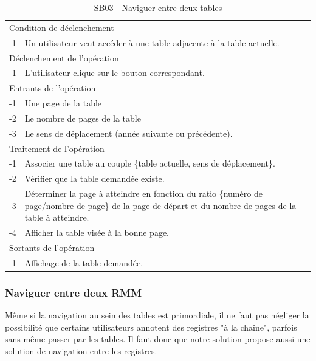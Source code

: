 \documentclass[a4paper]{article}
\begin{document}
\begin{table}[H]
  \centering
   \small
	\begin{tabular}{|c|p{12cm}|}
   		\hline
   			\rowcolor{lightgray}\multicolumn{2}{|c|}{\textbf{SB03 - Naviguer entre deux tables}} \\
   		\hline
   			\multicolumn{2}{|l|}{Condition de d\'eclenchement} \\
   		\hline
   		-1 & Un utilisateur veut acc\'eder \`a une table adjacente à la table actuelle. \\
   		\hline
   			\multicolumn{2}{|l|}{D\'eclenchement de l'op\'eration} \\
   		\hline
   			-1 & L'utilisateur clique sur le bouton correspondant. \\
   		\hline
   			\multicolumn{2}{|l|}{Entrants de l'op\'eration} \\
   		\hline
   			-1 & Une page de la table \\
        	-2 & Le nombre de pages de la table \\ 
            -3 & Le sens de déplacement (année suivante ou précédente). \\
   		\hline
   			\multicolumn{2}{|l|}{Traitement de l'op\'eration} \\
  		\hline
   			-1 & Associer une table au couple \{table actuelle, sens de d\'eplacement\}.  \\
        	-2 & V\'erifier que la table demand\'ee existe. \\
        	-3 & Déterminer la page à atteindre en fonction du ratio \{numéro de page/nombre de page\} de la page de départ et du nombre de pages de la table à atteindre. \\
            -4 & Afficher la table visée à la bonne page. \\
   		\hline
   			\multicolumn{2}{|l|}{Sortants de l'op\'eration} \\
   		\hline
   			-1 & Affichage de la table demand\'ee. \\
   		\hline
	\end{tabular}
  \caption{SB03 - Naviguer entre deux tables}
  \normalsize
  \label{tab:naviguer_deux_tables}
\end{table}
\newpage

\subsubsection{Naviguer entre deux RMM}

Même si la navigation au sein des tables est primordiale, il ne faut pas négliger la possibilité que certains utilisateurs annotent des registres "à la chaîne", parfois sans même passer par les tables. Il faut donc que notre solution propose aussi une solution de navigation entre les registres.
\end{document}
